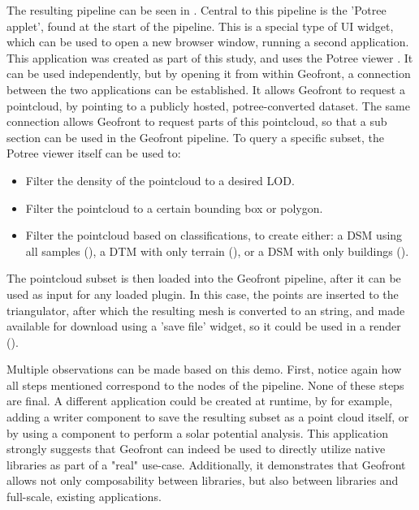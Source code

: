 The resulting pipeline can be seen in . 
Central to this pipeline is the 'Potree applet', found at the start of the pipeline. This is a special type of \ac{UI} widget, which can be used to open a new browser window, running a second application.
This application was created as part of this study, and uses the Potree viewer \citep*{schutz_potree_2022}. 
It can be used independently, but by opening it from within Geofront, a connection between the two applications can be established. 
It allows Geofront to request a pointcloud, by pointing to a publicly hosted, potree-converted dataset. 
The same connection allows Geofront to request parts of this pointcloud, so that a sub section can be used in the Geofront pipeline. 
To query a specific subset, the Potree viewer itself can be used to:
\begin{itemize}[-]
  \item Filter the density of the pointcloud to a desired LOD.
  \item Filter the pointcloud to a certain bounding box or polygon.
  \item Filter the pointcloud based on classifications, to create either: 
  \subitem a DSM using all samples (),
  \subitem a DTM with only terrain (), or
  \subitem a DSM with only buildings ().
\end{itemize}

The pointcloud subset is then loaded into the Geofront pipeline, after it can be used as input for any loaded plugin. 
In this case, the points are inserted to the  triangulator, after which the resulting mesh is converted to an  string, and made available for download using a 'save file' widget, so it could be used in a render ().


Multiple observations can be made based on this demo.
First, notice again how all steps mentioned correspond to the nodes of the pipeline. 
None of these steps are final. 
A different application could be created at runtime, by for example, adding a  writer component to save the resulting subset as a point cloud itself, or by using a component to perform a solar potential analysis. 
This application strongly suggests that Geofront can indeed be used to directly utilize native libraries as part of a "real" use-case.
Additionally, it demonstrates that Geofront allows not only composability between libraries, but also between libraries and full-scale, existing applications.

